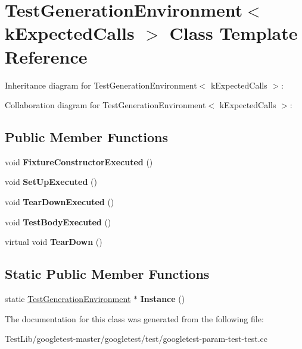 \hypertarget{classTestGenerationEnvironment}{}\section{Test\+Generation\+Environment$<$ k\+Expected\+Calls $>$ Class Template Reference}
\label{classTestGenerationEnvironment}


Inheritance diagram for Test\+Generation\+Environment$<$ k\+Expected\+Calls $>$\+:


Collaboration diagram for Test\+Generation\+Environment$<$ k\+Expected\+Calls $>$\+:
\subsection*{Public Member Functions}
\begin{DoxyCompactItemize}
\item 
\mbox{\label{classTestGenerationEnvironment_abcdae77887fbd6dba18f4a55b80f058d}} 
void {\bfseries Fixture\+Constructor\+Executed} ()
\item 
\mbox{\label{classTestGenerationEnvironment_aa17c620af5eb9929bdbde25820cd8e28}} 
void {\bfseries Set\+Up\+Executed} ()
\item 
\mbox{\label{classTestGenerationEnvironment_a0d2576b10818bae1945e17e6e749ff9b}} 
void {\bfseries Tear\+Down\+Executed} ()
\item 
\mbox{\label{classTestGenerationEnvironment_a358a1d7cbefc3f9157f625f87dbde754}} 
void {\bfseries Test\+Body\+Executed} ()
\item 
\mbox{\label{classTestGenerationEnvironment_ac3787d8afb43b97b0b3d6dec78b04798}} 
virtual void {\bfseries Tear\+Down} ()
\end{DoxyCompactItemize}
\subsection*{Static Public Member Functions}
\begin{DoxyCompactItemize}
\item 
\mbox{\label{classTestGenerationEnvironment_a5b8e14f430fe11d558c0e4482cebd694}} 
static \hyperlink{classTestGenerationEnvironment}{Test\+Generation\+Environment} $\ast$ {\bfseries Instance} ()
\end{DoxyCompactItemize}


The documentation for this class was generated from the following file\+:\begin{DoxyCompactItemize}
\item 
Test\+Lib/googletest-\/master/googletest/test/googletest-\/param-\/test-\/test.\+cc\end{DoxyCompactItemize}
